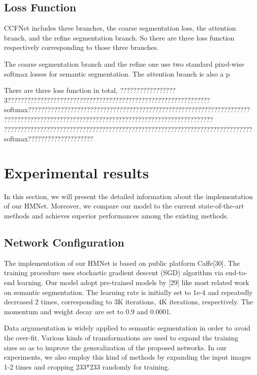 \documentclass[10.5pt,compsoc]{TsT}
\theoremstyle{mystyle}
\begin{document}
{\subsection{Loss Function}
\noindent

CCFNet includes three branches, the coarse segmentation loss, the attention branch, and the refine segmentation branch. 
So there are three loss function respectively corresponding to those three branches.

The coarse segmentation branch and the refine one use two standard pixel-wise softmax losses for semantic segmentation.
The attention branch is also a p

There are three loss function in total, 
?????????????????3??????????????????????????????????????????????????????????????softmax????????????????????????????????????????????????????????????????????????????????????????????????????????????????????????????????????
????????????????????????????????????????????????????????????????????????????softmax????????????????????


\section{Experimental results}
\label{s:results}
\noindent
In this section, we will present the detailed information about the implementation of our HMNet. Moreover, we compare our model to the current state-of-the-art methods and achieves superior performances among the existing methods.

\subsection{Network Configuration}
\noindent
The implementation of our HMNet is based on public platform Caffe[30]. The training procedure uses stochastic gradient descent (SGD) algorithm via end-to-end learning. Our model adopt pre-trained models by [29] like most related work on semantic segmentation. The learning rate is initially set to 1e-4 and repeatedly decreased 2 times, corresponding to 3K iterations, 4K iterations, respectively. The momentum and weight decay are set to 0.9 and 0.0001.

Data argumentation is widely applied to semantic segmentation in order to avoid the over-fit. Various kinds of transformations are used to expand the training sizes so as to improve the generalization of the proposed networks. In our experiments, we also employ this kind of methods by expanding the input images 1-2 times and cropping 233*233 randomly for training.  

}
\end{document}
